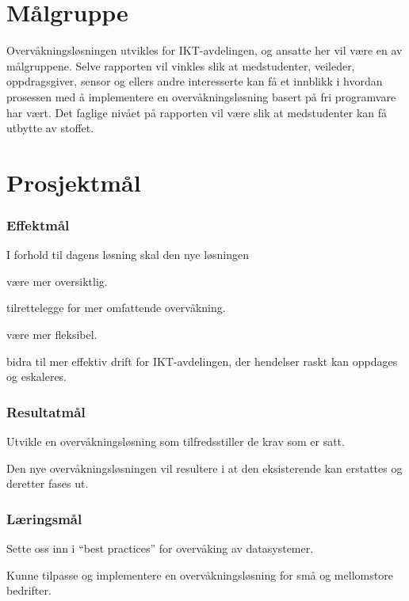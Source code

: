 \section{Målgruppe}
Overvåkningsløsningen utvikles for IKT-avdelingen, og ansatte her vil være en av målgruppene. Selve rapporten vil vinkles slik at medstudenter, veileder, oppdragsgiver, sensor og ellers andre interesserte kan få et innblikk i hvordan prosessen med å implementere en overvåkningsløsning basert på fri programvare har vært. Det faglige nivået på rapporten vil være slik at medstudenter kan få utbytte av stoffet.

\section{Prosjektmål}
\subsubsection{Effektmål}
I forhold til dagens løsning skal den nye løsningen
\begin{itemize*}
	\item være mer oversiktlig.
	\item tilrettelegge for mer omfattende overvåkning.
	\item være mer fleksibel.
	\item bidra til mer effektiv drift for IKT-avdelingen, der hendelser raskt kan oppdages og eskaleres.
\end{itemize*}

\subsubsection{Resultatmål}
\begin{itemize*}
	\item Utvikle en overvåkningsløsning som tilfredsstiller de krav som er satt.
	\item Den nye overvåkningsløsningen vil resultere i at den eksisterende kan erstattes og deretter fases ut.
\end{itemize*}

\subsubsection{Læringsmål}
\begin{itemize*}
	\item Sette oss inn i ``best practices'' for overvåking av datasystemer.
	\item Kunne tilpasse og implementere en overvåkningsløsning for små og mellomstore bedrifter.
\end{itemize*}


